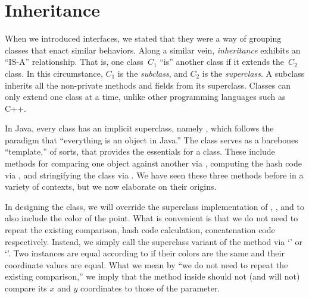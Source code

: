 \section{Inheritance}

When we introduced interfaces, we stated that they were a way of grouping classes that enact similar behaviors. Along a similar vein, \emph{inheritance} exhibits an ``IS-A'' relationship. That is, one class~$C_1$ ``is'' another class if it extends the~$C_2$ class. In this circumstance, $C_1$ is the \emph{subclass}, and $C_2$ is the \emph{superclass}. A subclass inherits all the non-private methods and fields from its superclass. Classes can only extend one class at a time, unlike other programming languages such as C++. 

In Java, every class has an implicit superclass, namely , which follows the paradigm that ``everything is an object in Java.'' The  class serves as a barebones ``template,'' of sorts, that provides the essentials for a class. These include methods for comparing one object against another via , computing the hash code via , and stringifying the class via . We have seen these three methods before in a variety of contexts, but we now elaborate on their origins.


In designing the  class, we will override the superclass implementation of , , and  to also include the color of the point. What is convenient is that we do not need to repeat the existing comparison, hash code calculation, concatenation code respectively. Instead, we simply call the superclass variant of the method via `' or `'. Two  instances are equal according to  if their colors are the same and their coordinate values are equal. What we mean by ``we do not need to repeat the existing comparison,'' we imply that the  method inside  should not (and will not) compare its $x$ and $y$ coordinates to those of the parameter.

